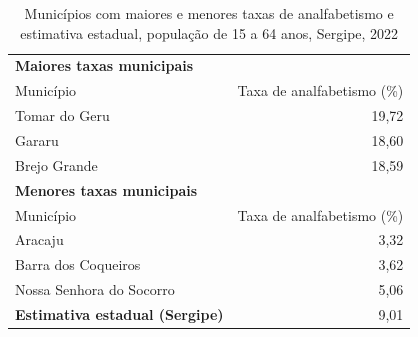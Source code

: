 \begin{table}[H]
\centering
\caption{Municípios com maiores e menores taxas de analfabetismo e estimativa estadual, população de 15 a 64 anos, Sergipe, 2022}
\label{tab:item3-analfabetismo}
\small
\begin{tabular}{l r}
\toprule
\multicolumn{2}{l}{\textbf{Maiores taxas municipais}} \\
Município & Taxa de analfabetismo (\%) \\
\midrule
Tomar do Geru & 19,72 \\
Gararu & 18,60 \\
Brejo Grande & 18,59 \\
\midrule
\multicolumn{2}{l}{\textbf{Menores taxas municipais}} \\
Município & Taxa de analfabetismo (\%) \\
\midrule
Aracaju & 3,32 \\
Barra dos Coqueiros & 3,62 \\
Nossa Senhora do Socorro & 5,06 \\
\midrule
\textbf{Estimativa estadual (Sergipe)} & 
9,01
 \\
\bottomrule
\end{tabular}
\begingroup
{}
\par
\endgroup
\end{table}
